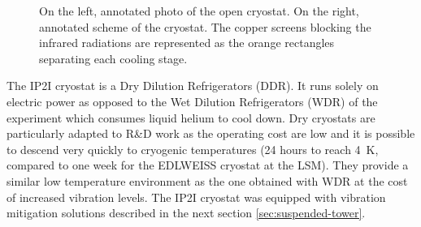 \begin{figure}
\begin{minipage}{0.48\textwidth}
\end{minipage}
\caption{On the left, annotated photo of the open cryostat. On the right, annotated scheme of the cryostat. The copper screens blocking the infrared radiations are represented as the orange rectangles separating each cooling stage.}
\label{fig:cryo-photo} 
\end{figure}

The IP2I cryostat is a Dry Dilution Refrigerators (DDR). It runs solely on electric power as opposed to the Wet Dilution Refrigerators (WDR) of the \Edelweiss{} experiment which consumes liquid helium to cool down. Dry cryostats are particularly adapted to R\&D work as the operating cost are low and it is possible to descend very quickly to cryogenic temperatures (24 hours to reach \SI{4}{\kelvin}, compared to one week for the EDLWEISS cryostat at the LSM). They provide a similar low temperature environment as the one obtained with WDR at the cost of increased vibration levels. The IP2I cryostat was equipped with vibration mitigation solutions described in the next section \ref{sec:suspended-tower}.

